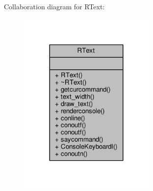 Collaboration diagram for R\+Text\+:
\nopagebreak
\begin{figure}[H]
\begin{center}
\leavevmode
\includegraphics[width=192pt]{da/d5e/classRText__coll__graph}
\end{center}
\end{figure}
